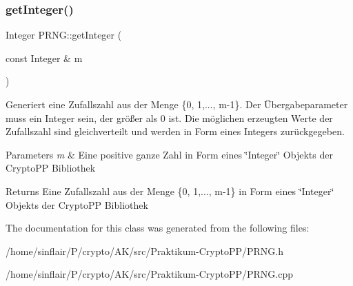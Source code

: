 \subsubsection{\texorpdfstring{get\+Integer()}{getInteger()}\hspace{0.1cm}{\footnotesize\ttfamily [2/2]}}
{\footnotesize\ttfamily Integer P\+R\+N\+G\+::get\+Integer (\begin{DoxyParamCaption}\item[{const Integer \&}]{m }\end{DoxyParamCaption})\hspace{0.3cm}{\ttfamily [virtual]}}

Generiert eine Zufallszahl aus der Menge \{0, 1,..., m-\/1\}. Der Übergabeparameter muss ein Integer sein, der größer als 0 ist. Die möglichen erzeugten Werte der Zufallszahl sind gleichverteilt und werden in Form eines Integers zurückgegeben.


\begin{DoxyParams}{Parameters}
{\em m} & Eine positive ganze Zahl in Form eines \char`\"{}\+Integer\char`\"{} Objekts der Crypto\+PP Bibliothek\\
\hline
\end{DoxyParams}
\begin{DoxyReturn}{Returns}
Eine Zufallszahl aus der Menge \{0, 1,..., m-\/1\} in Form eines \char`\"{}\+Integer\char`\"{} Objekts der Crypto\+PP Bibliothek 
\end{DoxyReturn}


The documentation for this class was generated from the following files\+:\begin{DoxyCompactItemize}
\item 
/home/sinflair/\+P/crypto/\+A\+K/src/\+Praktikum-\/\+Crypto\+P\+P/P\+R\+N\+G.\+h\item 
/home/sinflair/\+P/crypto/\+A\+K/src/\+Praktikum-\/\+Crypto\+P\+P/P\+R\+N\+G.\+cpp\end{DoxyCompactItemize}
